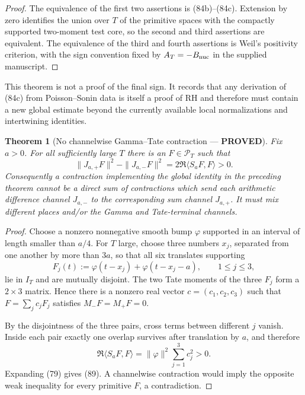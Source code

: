 \documentclass[11pt]{article}
\newtheorem{theorem}{Theorem}
\newcommand{\PROVED}{\textcolor{green!45!black}{\textbf{PROVED}}}
\begin{document}
\begin{proof}
The equivalence of the first two assertions is (84b)--(84c).  Extension by
zero identifies the union over $T$ of the primitive spaces with the compactly
supported two-moment test core, so the second and third assertions are
equivalent.  The equivalence of the third and fourth assertions is Weil's
positivity criterion, with the sign convention fixed by
$A_T=-B_{\rm nuc}$ in the supplied manuscript.
\end{proof}

This theorem is not a proof of the final sign.  It records that any derivation
of (84c) from Poisson--Sonin data is itself a proof of RH and therefore must
contain a new global estimate beyond the currently available local
normalizations and intertwining identities.

\begin{theorem}[No channelwise Gamma--Tate contraction --- \PROVED]
Fix $a>0$.  For all sufficiently large $T$ there is an
$F\in\mathcal P_T$ such that
\begin{equation}
 \|J_{a,+}F\|^2-\|J_{a,-}F\|^2
 =2\Re\langle S_aF,F\rangle>0.                         \tag{89}
\end{equation}
Consequently a contraction implementing the global identity in the preceding
theorem cannot be a direct sum of contractions which send each arithmetic
difference channel $J_{a,-}$ to the corresponding sum channel $J_{a,+}$.
It must mix different places and/or the Gamma and Tate-terminal channels.
\end{theorem}

\begin{proof}
Choose a nonzero nonnegative smooth bump $\varphi$ supported in an interval
of length smaller than $a/4$.  For $T$ large, choose three numbers $x_j$,
separated from one another by more than $3a$, so that all six translates
supporting
\[
 F_j(t):=\varphi(t-x_j)+\varphi(t-x_j-a),\qquad 1\le j\le3,
\]
lie in $I_T$ and are mutually disjoint.  The two Tate moments of the three
$F_j$ form a $2\times3$ matrix.  Hence there is a nonzero real vector
$c=(c_1,c_2,c_3)$ such that
$F=\sum_jc_jF_j$ satisfies $M_-F=M_+F=0$.

By the disjointness of the three pairs, cross terms between different $j$
vanish.  Inside each pair exactly one overlap survives after translation by
$a$, and therefore
\[
 \Re\langle S_aF,F\rangle
 =\|\varphi\|^2\sum_{j=1}^3c_j^2>0.
\]
Expanding (79) gives (89).  A channelwise contraction would imply the
opposite weak inequality for every primitive $F$, a contradiction.
\end{proof}
\end{document}
